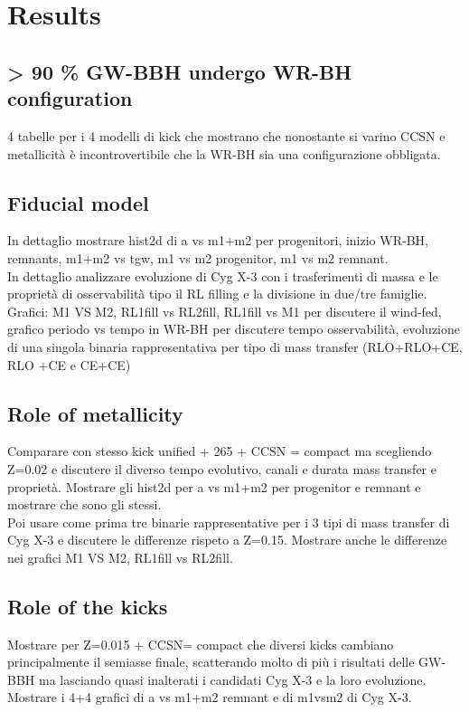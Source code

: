 \documentclass[a4paper,titlepage]{book}     	%
\begin{document}
\chapter{Results}\label{sec:results}
\section{> 90 \% GW-BBH undergo WR-BH configuration}
4 tabelle per i 4 modelli di kick che mostrano che nonostante si varino CCSN e metallicità è incontrovertibile che la WR-BH sia una configurazione obbligata.

\section{Fiducial model}
In dettaglio mostrare hist2d di a vs m1+m2 per progenitori, inizio WR-BH, remnants, m1+m2 vs tgw, m1 vs m2 progenitor, m1 vs m2 remnant.\\
In dettaglio analizzare evoluzione di Cyg X-3 con i trasferimenti di massa e le proprietà di osservabilità tipo il RL filling e la divisione in due/tre famiglie. Grafici: M1 VS M2, RL1fill vs RL2fill, RL1fill vs M1 per discutere il wind-fed, grafico periodo vs tempo in WR-BH per discutere tempo osservabilità, evoluzione di una singola binaria rappresentativa per tipo di mass transfer (RLO+RLO+CE, RLO +CE e CE+CE)

\section{Role of metallicity}
Comparare con stesso kick unified + 265 + CCSN = compact ma scegliendo Z=0.02 e discutere il diverso tempo evolutivo, canali e durata mass transfer e proprietà.
Mostrare gli hist2d per a vs m1+m2 per progenitor e remnant e mostrare che sono gli stessi.\\
Poi usare come prima tre binarie rappresentative per i 3 tipi di mass transfer di Cyg X-3 e discutere le differenze rispeto a Z=0.15. Mostrare anche le differenze nei grafici M1 VS M2, RL1fill vs RL2fill.


\section{Role of the kicks}
Mostrare per Z=0.015 + CCSN= compact che diversi kicks cambiano principalmente il semiasse finale, scatterando molto di più i risultati delle GW-BBH ma lasciando quasi inalterati i candidati Cyg X-3 e la loro evoluzione. Mostrare i 4+4 grafici di a vs m1+m2 remnant e di m1vsm2 di Cyg X-3.
\end{document}
